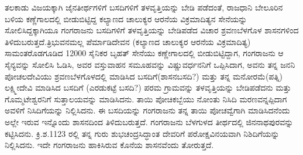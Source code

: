 ತಲಕಾಡು ವಿಜಯಕ್ಕಾಗಿ ಜೈನತೀರ್ಥಗಳಿಗೆ ಬಸದಿಗಳಿಗೆ ತಳವೃತ್ತಿಯನ್ನು ಬೇಡಿ ಪಡೆದಂತೆ, ರಾಜಧಾನಿ ಬೇಲೂರಿನ ಬಳಿಯ ಕಣ್ಣೆಗಾಲದಲ್ಲಿ ಬೀಡುಬಿಟ್ಟಿದ್ದ ಕಲ್ಯಾಣದ ಚಾಲುಕ್ಯರ ಆರನೆಯ ವಿಕ್ರಮಾದಿತ್ಯನ ಸೇನೆಯನ್ನು ಸೋಲಿಸಿದ್ದಕ್ಕಾಗಿಯೂ ಗಂಗರಾಜನು ಬಸದಿಗಳಿಗೆ ತಳವೃತ್ತಿಯನ್ನು ಬೇಡಿಪಡೆದ ವಿಚಾರ ಶ್ರವಣಬೆಳಗೊಳ ಶಾಸನಗಳಿಂದ ತಿಳಿದುಬರುತ್ತದೆ.\break ತ್ರಿಭುವನಮಲ್ಲ ಪೆರ್ಮಾಡಿದೇವನ (ಕಲ್ಯಾಣದ ಚಾಲುಕ್ಯರ ಆರನೆಯ ವಿಕ್ರಮಾದಿತ್ಯ) ಸಾಮಂತರೊಡಗೂಡಿದ 12000 ಸೈನಿಕರ ಬೃಹತ್​ ಸೇನೆಯು ಕಣ್ಣೇಗಾಲದಲ್ಲಿ ಬೀಡುಬಿಟ್ಟಿದ್ದಾಗ, ಗಂಗರಾಜನು ಆ ಸೈನ್ಯವನ್ನು ಸೋಲಿಸಿ ಓಡಿಸಿ, ಅವರ ವಸ್ತುವಾಹನ ಸಮೂಹವನ್ನು ವಿಷ್ಣುವರ್ಧನನಿಗೆ ಒಪ್ಪಿಸಿದಾಗ, ಅವನು ತನ್ನ ಜನನಿ ಪೋಚಲದೇವಿಯು ಶ್ರವಣಬೆಳಗೊಳದಲ್ಲಿ ಮಾಡಿಸಿದ ಬಸದಿಗೆ(ಶಾಸನಬಸದಿ?) ಮತ್ತು ತನ್ನ ಮನೋರಮೆ(ಪತ್ನಿ) ಲಕ್ಷ್ಮೀದೇವಿ ಮಾಡಿಸಿದ ಬಸದಿಗೆ (ಎರಡುಕಟ್ಟೆ ಬಸದಿ?) ಪರಮ ಗ್ರಾಮವನ್ನು ತಳವೃತ್ತಿಯನ್ನು ಬೇಡಿಪಡೆದನು ಮತ್ತು ಗೊಮ್ಮಟೇಶ್ವರನಿಗೆ ಸುತ್ತಾಲಯವನ್ನು ಮಾಡಿಸಿದನು. ತಾಯಿ ಪೋಚಿಕಬ್ಬೆಯು ನೋಂತು ನಿಸಿದಿ ಮರಣವನ್ನಪ್ಪಿದಾಗ ಅವಳಿಗೆ ನಿಸಿದಿಗೆಯನ್ನು ನಿಲ್ಲಿಸಿದನು. ಈ ಬಸದಿಯನ್ನು ಗಂಗರಾಜನು ತನ್ನ ತಾಯಿ ಪೋಚವ್ವೆಗಾಗಿ ಮಾಡಿಸಿದನೆಂದು ಅಲ್ಲೇ ಇರುವ ಇನ್ನೊಂದು ಶಾಸನದಿಂದ ತಿಳಿದುಬರುತ್ತದೆ. ಗಂಗರಾಜನು ಬೆಳಗುಳದ ತೀರ್ಥದಲ್ಲಿ ಜಿನನಾಥಪುರವನ್ನು ಕಟ್ಟಿಸಿದನು. ಕ್ರಿ.ಶ.1123 ರಲ್ಲಿ ತನ್ನ ಗುರು ಶುಭಚಂದ್ರಸಿದ್ಧಾಂತ ದೇವರಿಗೆ ಪರೋಕ್ಷವಿನಯವಾಗಿ ನಿಶಿದಿಗೆಯನ್ನು ನಿಲ್ಲಿಸಿದನು. ಇದೇ ಗಂಗರಾಜನು ಹಾಕಿಸಿರುವ ಕೊನೆಯ ಶಾಸನವೆಂದು ತೋರುತ್ತದೆ.

